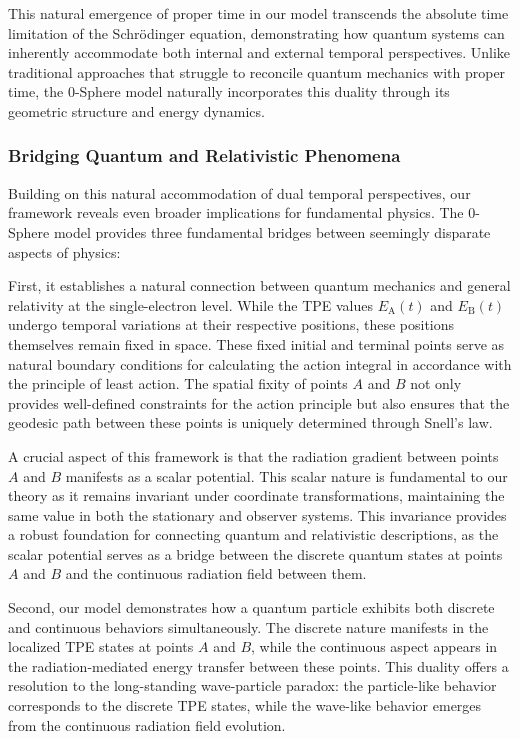 \documentclass[%
 reprint,
 amsmath,amssymb,
 aps,
]{revtex4-1}
\numberwithin{equation}{section}%
\begin{document}
This natural emergence of proper time in our model transcends the absolute time limitation of the Schrödinger equation, demonstrating how quantum systems can inherently accommodate both internal and external temporal perspectives. Unlike traditional approaches that struggle to reconcile quantum mechanics with proper time, the 0-Sphere model naturally incorporates this duality through its geometric structure and energy dynamics.

\subsubsection{\label{sec:Bridging Quantum and}Bridging Quantum and Relativistic Phenomena}

Building on this natural accommodation of dual temporal perspectives, our framework reveals even broader implications for fundamental physics. The 0-Sphere model provides three fundamental bridges between seemingly disparate aspects of physics:

First, it establishes a natural connection between quantum mechanics and general relativity at the single-electron level. While the TPE values $E_{\mathrm{A}}(t)$ and $E_{\mathrm{B}}(t)$ undergo temporal variations at their respective positions, these positions themselves remain fixed in space. These fixed initial and terminal points serve as natural boundary conditions for calculating the action integral in accordance with the principle of least action. The spatial fixity of points $A$ and $B$ not only provides well-defined constraints for the action principle but also ensures that the geodesic path between these points is uniquely determined through Snell's law.

A crucial aspect of this framework is that the radiation gradient between points $A$ and $B$ manifests as a scalar potential. This scalar nature is fundamental to our theory as it remains invariant under coordinate transformations, maintaining the same value in both the stationary and observer systems. This invariance provides a robust foundation for connecting quantum and relativistic descriptions, as the scalar potential serves as a bridge between the discrete quantum states at points $A$ and $B$ and the continuous radiation field between them.

Second, our model demonstrates how a quantum particle exhibits both discrete and continuous behaviors simultaneously. The discrete nature manifests in the localized TPE states at points $A$ and $B$, while the continuous aspect appears in the radiation-mediated energy transfer between these points. This duality offers a resolution to the long-standing wave-particle paradox: the particle-like behavior corresponds to the discrete TPE states, while the wave-like behavior emerges from the continuous radiation field evolution.
\end{document}
